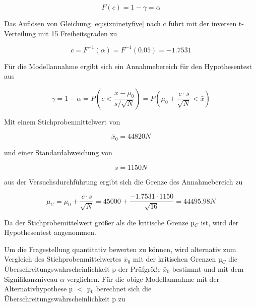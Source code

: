 \begin{equation}\label{eq:sixninetyfive}
F\left(c\right)=1-\gamma =\alpha 
\end{equation}

\noindent Das Aufl\"{o}sen von Gleichung \eqref{eq:sixninetyfive} nach c f\"{u}hrt mit der inversen t-Verteilung mit 15 Freiheitsgraden zu

\begin{equation}\label{eq:sixninetysix}
c=F^{-1} (\alpha)=F^{-1} (0.05)=-1.7531
\end{equation}

\noindent F\"{u}r die Modellannahme ergibt sich ein Annahmebereich f\"{u}r den Hypothesentest aus

\begin{equation}\label{eq:sixninetyseven}
\gamma =1-\alpha =P\left(c<\dfrac{\bar{x}-\mu _{0}}{s/\sqrt{N}} \right)=P\left(\mu _{0} +\dfrac{c\cdot s}{\sqrt{N}} <\bar{x}\right)
\end{equation}

\noindent Mit einem Stichprobenmittelwert von

\begin{equation}\label{eq:sixninetyeight}
\bar{x}_{0} =44820 N
\end{equation}

\noindent und einer Standardabweichung von

\begin{equation}\label{eq:sixninetynine}
s=1150 N
\end{equation}

\noindent aus der Versuchsdurchf\"{u}hrung ergibt sich die Grenze des Annahmebereich zu

\begin{equation}\label{eq:sixonehundred}
\mu _{C} =\mu _{0} +\dfrac{c\cdot s}{\sqrt{N}} =45000+\dfrac{-1.7531\cdot 1150}{\sqrt{16}}=44495.98 N
\end{equation}

\noindent Da der Stichprobemittelwert gr\"{o}{\ss}er als die kritische Grenze µ$_{C}$ ist, wird der Hypothesentest angenommen.

\noindent Um die Fragestellung quantitativ bewerten zu k\"{o}nnen, wird alternativ zum Vergleich des Stichprobenmittelwertes $\bar{x}_0$ mit der kritischen Grenzen µ$_{C}$ die \"{U}berschreitungswahrscheinlichkeit p der Pr\"{u}fgr\"{o}{\ss}e $\bar{x}_0$ bestimmt und mit dem Signifikanzniveau $\alpha$ verglichen. F\"{u}r die obige Modellannahme mit der Alternativhypothese µ $<$ µ$_{0}$ berechnet sich die \"{U}berschreitungswahrscheinlichkeit p zu

